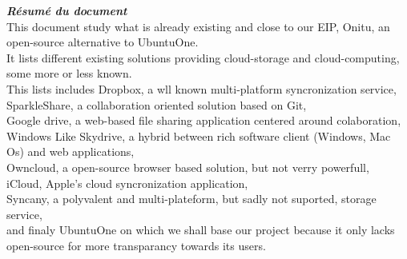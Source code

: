 \thispagestyle{empty}
\vspace*{10mm}

\textbf{\emph{\textcolor{epiBlue}{Résumé du document} } }\\

This document study what is already existing and close to our EIP, Onitu, an open-source alternative to UbuntuOne.\\
It lists different existing solutions providing cloud-storage and cloud-computing, some more or less known.\\
This lists includes Dropbox, a wll known multi-platform syncronization service,\\
SparkleShare, a collaboration oriented solution based on Git,\\
Google drive, a web-based file sharing application centered around colaboration,\\
Windows Like Skydrive, a hybrid between rich software client (Windows, Mac Os) and web applications,\\
Owncloud, a open-source browser based solution, but not verry powerfull,\\
iCloud, Apple's cloud syncronization application,\\
Syncany, a polyvalent and multi-plateform, but sadly not suported, storage service,\\
and finaly UbuntuOne on which we shall base our project because it only lacks open-source for more transparancy towards its users.

\newpage
